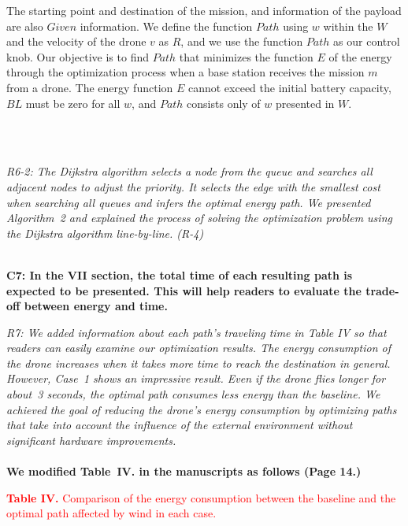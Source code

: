 \documentclass[onecolumn]{IEEEconf}
\begin{document}
\begin{description}
\begin{mdframed}[ linewidth=.75pt, userdefinedwidth=0.9\textwidth]
{    The starting point and destination of the mission, and information of the payload are also $Given$ information.
    We define the function $Path$ using $w$ within the $W$ and the velocity of the drone $v$ as $R$, and we use the function $Path$ as our control knob.
    Our objective is to find $Path$ that minimizes the function $E$ of the energy through the optimization process when a base station receives the mission $m$ from a drone.
    The energy function $E$ cannot exceed the initial battery capacity, $BL$ must be zero for all $w$, and $Path$ consists only of $w$ presented in $W$.}
    \end{mdframed} 
    ~\\
    ~\\
	\item \textit
    {
	R6-2: The Dijkstra algorithm selects a node from the queue and searches all adjacent nodes to adjust the priority. It selects the edge with the smallest cost when searching all queues and infers the optimal energy path. We presented Algorithm~2 and explained the process of solving the optimization problem using the Dijkstra algorithm line-by-line. (R-4)
	}
	~\\
	~\\
    \item \textbf
    {
	C7: In the VII section, the total time of each resulting path is expected to be presented.  This will help readers to evaluate the trade-off between energy and time.
	}
	\item \textit
	{
	R7: We added information about each path’s traveling time in Table IV so that readers can easily examine our optimization results. The energy consumption of the drone increases when it takes more time to reach the destination in general. However, Case~1 shows an impressive result. Even if the drone flies longer for about~3 seconds, the optimal path consumes less energy than the baseline. We achieved the goal of reducing the drone's energy consumption by optimizing paths that take into account the influence of the external environment without significant hardware improvements.
	}
    ~\\
	~\\
	\textbf{We modified Table~IV. in the manuscripts as follows (Page 14.)}\\
    \begin{mdframed}[ linewidth=.75pt, userdefinedwidth=0.9\textwidth]
     \textcolor{red}{\textbf{Table IV.} Comparison of the energy consumption between the baseline and the optimal path affected by wind in each case.}  

\end{mdframed}
\end{description}
\end{document}
